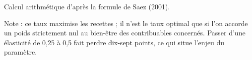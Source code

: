 Calcul arithmétique d'après la formule de Saez (2001).\par Note : ce taux maximise les recettes ; il n'est le taux optimal que si l'on accorde un poids strictement nul au bien-être des contribuables concernés. Passer d'une élasticité de 0,25 à 0,5 fait perdre dix-sept points, ce qui situe l'enjeu du paramètre.
